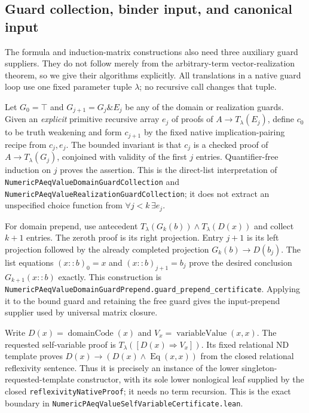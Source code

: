 \subsection{Guard collection, binder input, and canonical input}
\label{sec:term-guard-auxiliaries}

The formula and induction-matrix constructions also need three auxiliary
guard suppliers.  They do not follow merely from the arbitrary-term
vector-realization theorem, so we give their algorithms explicitly.
All translations in a native guard loop use one fixed parameter tuple
$\lambda$; no recursive call changes that tuple.

Let $G_0=\top$ and $G_{j+1}=G_j\mathbin\&E_j$ be any of the
domain or realization guards.  Given an \emph{explicit} primitive
recursive array $e_j$ of proofs of $A\to T_\lambda(E_j)$, define
$c_0$ to be truth weakening and form $c_{j+1}$ by the fixed native
implication-pairing recipe from $c_j,e_j$.  The bounded invariant is
that $c_j$ is a checked proof of $A\to T_\lambda(G_j)$, conjoined
with validity of the first $j$ entries.  Quantifier-free induction on
$j$ proves the assertion.  This is the direct-list interpretation of
\texttt{NumericPAeqValueDomainGuardCollection} and
\texttt{NumericPAeqValueRealizationGuardCollection}; it does not
extract an unspecified choice function from
$\forall j<k\,\exists e_j$.

For domain prepend, use antecedent
$T_\lambda(G_k(b))\wedge T_\lambda(D(x))$ and collect $k+1$
entries.  The zeroth proof is its right projection.  Entry $j+1$
is its left projection followed by the already completed projection
$G_k(b)\to D(b_j)$.  The list equations
$(x::b)_0=x$ and $(x::b)_{j+1}=b_j$ prove the desired conclusion
$G_{k+1}(x::b)$ exactly.  This construction is
\texttt{NumericPAeqValueDomainGuardPrepend.guard\_prepend\_certificate}.
Applying it to the bound guard and retaining the free guard gives
the input-prepend supplier used by universal matrix closure.

Write $D(x)=\operatorname{domainCode}(x)$ and
$V_x=\operatorname{variableValue}(x,x)$.
The requested self-variable proof is
$T_\lambda([D(x)\Rightarrow V_x])$.
Its fixed relational ND template proves
$D(x)\to(D(x)\wedge\operatorname{Eq}(x,x))$ from the
closed relational reflexivity sentence.  Thus it is precisely an
instance of the lower singleton-requested-template constructor,
with its sole lower nonlogical leaf supplied by the closed
\texttt{reflexivityNativeProof}; it needs no term recursion.
This is the exact boundary in
\texttt{NumericPAeqValueSelfVariableCertificate.lean}.

